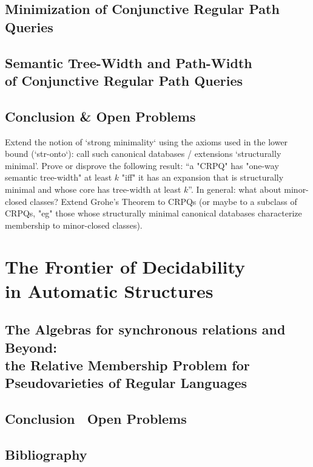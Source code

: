 \documentclass[a4paper,sfsidenotes,twoside,justified,nobib]{tufte-book-custom}
\begin{document}
\chapter{Minimization of Conjunctive Regular Path Queries}

\chapter[{Semantic Tree-Width and Path-Width of Conjunctive Regular Path Queries}]{Semantic Tree-Width and Path-Width\\of Conjunctive Regular Path Queries}


\chapter{Conclusion \& Open Problems}


Extend the notion of `strong minimality` using the axioms used in the lower bound (`str-onto`): call such canonical databases / extensions `structurally minimal'.
Prove or disprove the following result: ``a "CRPQ" has "one-way semantic tree-width" at least $k$ "iff" it has an expansion that is structurally minimal and whose core has tree-width at least $k$''. In general: what about minor-closed classes?
Extend Grohe's Theorem to CRPQs (or maybe to a subclass of CRPQs, "eg" those whose
structurally minimal canonical databases characterize membership to minor-closed classes).

\part[The Frontier of Decidability in Automatic Structures]{The Frontier of Decidability\\in Automatic Structures}




\chapter{The Algebras for synchronous relations and Beyond:\\the Relative Membership Problem for Pseudovarieties of Regular Languages}

\chapter{Conclusion \fancyand~Open Problems}

\backmatter
\begin{fullwidth}
	\chapter*{Bibliography}
	\setlength{\columnsep}{8mm}
	\begin{multicols}{2}
		\printbibliography[heading=none]
	\end{multicols}
\end{fullwidth}
\end{document}

